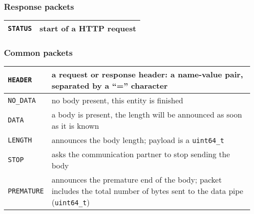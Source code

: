 \documentclass[a4paper,12pt]{article}
\begin{document}
\subsubsection{Response packets}

\begin{longtable}{|l|p{10cm}|}
\hline

\texttt{STATUS} & start of a HTTP request \\

\hline
\end{longtable}

\subsubsection{Common packets}

\begin{longtable}{|l|p{10cm}|}
\hline

\texttt{HEADER} & a request or response header: a name-value pair,
separated by a ``='' character \\

\hline

\texttt{NO\_DATA} & no body present, this entity is finished \\

\hline

\texttt{DATA} & a body is present, the length will be announced as
soon as it is known \\

\hline

\texttt{LENGTH} & announces the body length; payload is a
\texttt{uint64\_t} \\

\hline

\texttt{STOP} & asks the communication partner to stop sending the
body \\

\hline

\texttt{PREMATURE} & announces the premature end of the body; packet
includes the total number of bytes sent to the data pipe
(\texttt{uint64\_t}) \\

\hline
\end{longtable}
\end{document}
